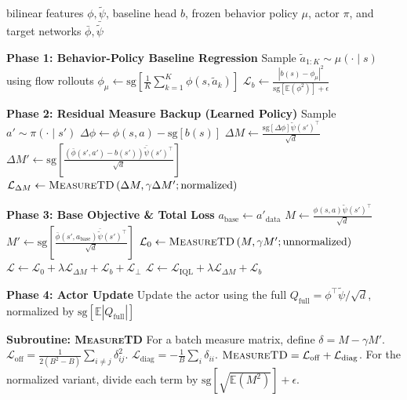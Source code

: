 \documentclass[11pt]{article}
\newcommand{\E}{\mathbb{E}}
\newcommand{\sg}{\mathrm{sg}}
\begin{document}
\begin{algorithm}[t]
\caption{Centered successor-measure objective}
\label{alg:centered}
\begin{algorithmic}[1]

\Require bilinear features $\phi,\tilde\psi$, baseline head $b$, frozen behavior policy $\mu$, actor $\pi$, and target networks $\bar\phi,\bar{\tilde\psi}$

\Statex \textbf{Phase 1: Behavior-Policy Baseline Regression}
\State Sample $\tilde a_{1:K}\sim\mu(\cdot\mid s)$ using flow rollouts 
\State $\phi_\mu\gets\sg\left[\frac{1}{K}\sum_{k=1}^K\phi(s,\tilde a_k)\right]$
\State $\mathcal L_b\gets\frac{|b(s)-\phi_\mu|^2}{\sg[\E(\phi^2)]+\epsilon}$

\Statex \textbf{Phase 2: Residual Measure Backup (Learned Policy)}
\State Sample $a'\sim\pi(\cdot\mid s')$
\State $\Delta\phi\gets\phi(s,a)-\sg[b(s)]$
\State $\Delta M\gets\frac{\sg[\Delta\phi]\tilde\psi(s')^\top}{\sqrt d}$
\State $\Delta M'\gets\sg\left[\frac{\left(\bar\phi(s',a')-b(s')\right)\bar{\tilde\psi}(s')^\top}{\sqrt d}\right]$
\State $\mathcal L_{\Delta M}\gets\textsc{MeasureTD}\left(\Delta M,\gamma\Delta M';\text{normalized}\right)$ 

\Statex \textbf{Phase 3: Base Objective \& Total Loss}
    \State $a_{\mathrm{base}}\gets a'_{\mathrm{data}}$ 
    \State $M\gets\frac{\phi(s,a)\tilde\psi(s')^\top}{\sqrt d}$
    \State $M'\gets\sg\left[\frac{\bar\phi(s',a_{\mathrm{base}})\bar{\tilde\psi}(s')^\top}{\sqrt d}\right]$
    \State $\mathcal L_0\gets\textsc{MeasureTD}\left(M,\gamma M';\text{unnormalized}\right)$
    \State $\mathcal L\gets\mathcal L_0+\lambda\mathcal L_{\Delta M}+\mathcal L_b+\mathcal L_\perp$
    \State $\mathcal L\gets\mathcal L_{\mathrm{IQL}}+\lambda\mathcal L_{\Delta M}+\mathcal L_b$
\EndIf

\Statex \textbf{Phase 4: Actor Update}
\State Update the actor using the full $Q_{\mathrm{full}}=\phi^\top\tilde\psi/\sqrt d$, normalized by $\sg[\E|Q_{\mathrm{full}}|]$

\Statex \textbf{Subroutine: \textsc{MeasureTD}}
\Statex For a batch measure matrix, define $\delta=M-\gamma M'$.
\Statex $\mathcal L_{\mathrm{off}}=\frac{1}{2(B^2-B)}\sum_{i\neq j}\delta_{ij}^2$.
\Statex $\mathcal L_{\mathrm{diag}}=-\frac{1}{B}\sum_i\delta_{ii}$.
\Statex $\textsc{MeasureTD}=\mathcal L_{\mathrm{off}}+\mathcal L_{\mathrm{diag}}$.
\Statex For the normalized variant, divide each term by $\sg[\sqrt{\E(M^2)}]+\epsilon$.

\end{algorithmic}
\end{algorithm}
\end{document}
